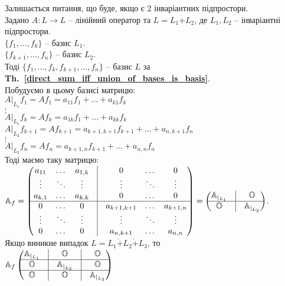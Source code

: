 \documentclass[a4paper, 10pt]{article}
\theoremstyle{theoremdd}
\newcommand\thref[1]{\textbf{Th.~\ref{#1}}}
\begin{document}
\fi
\noindent
Залишається питання, що буде, якщо є 2 інваріантних підпростори.\\
Задано $A \colon L \to L$ -- лінійний оператор та $L = L_1 \dot{+} L_2$, де $L_1,L_2$ -- інваріантні підпростори.\\
$\{f_1,\dots,f_k\}$ -- базис $L_1$.\\
$\{f_{k+1},\dots,f_{n}\}$ -- базис $L_2$.\\
Тоді $\{f_1,\dots,f_k,f_{k+1},\dots,f_n\}$ -- базис $L$ за \thref{direct_sum_iff_union_of_bases_is_basis}.\\
Побудуємо в цьому базисі матрицю:\\
$A|_{L_1}f_1 = Af_1 = a_{11}f_1 + \dots + a_{k1}f_k$\\
$\vdots$\\
$A|_{L_1}f_k = Af_k = a_{1k}f_1 + \dots + a_{kk}f_k$\\
$A|_{L_2}f_{k+1} = Af_{k+1} = a_{k+1,k+1}f_{k+1} + \dots + a_{n,k+1}f_n$\\
$\vdots$\\
$A|_{L_2}f_n = Af_n = a_{k+1,n}f_{k+1} + \dots + a_{n,n}f_n$\\
Тоді маємо таку матрицю:\\
$\mathbb{A}_f = \begin{pmatrix}
a_{11} & \dots & a_{1,k} & \vline & 0 & \dots & 0 \\
\vdots & \ddots & \vdots & \vline & \vdots & \ddots & \vdots \\
a_{k,1} & \dots & a_{k,k} & \vline & 0 & \dots & 0 \\
\hline
0 & \dots & 0 & \vline & a_{k+1,k+1} & \dots & a_{k+1, n} \\
\vdots & \ddots & \vdots & \vline & \vdots & \ddots & \vdots \\
0 & \dots & 0 & \vline & a_{n,k+1} & \dots & a_{n, n} \\
\end{pmatrix} = \begin{pmatrix}
\mathbb{A}_{|_{L_1}}  & \vline & \mathbb{O} \\
 \hline
 \mathbb{O} & \vline & \mathbb{A}_{|_{L_2}}
\end{pmatrix}$.
\bigskip \\
Якщо виникне випадок $L = L_1 \dot{+} L_2 \dot{+} L_3$, то\\
$\mathbb{A}_f \begin{pmatrix} 
\mathbb{A}_{|_{L_1}}  & \vline & \mathbb{O} & \vline & \mathbb{O} \\
 \hline
\mathbb{O}  & \vline & \mathbb{A}_{|_{L_2}} & \vline & \mathbb{O} \\
 \hline
\mathbb{O}  & \vline & \mathbb{O} & \vline & \mathbb{A}_{|_{L_3}} \\
\end{pmatrix}$
\end{document}

